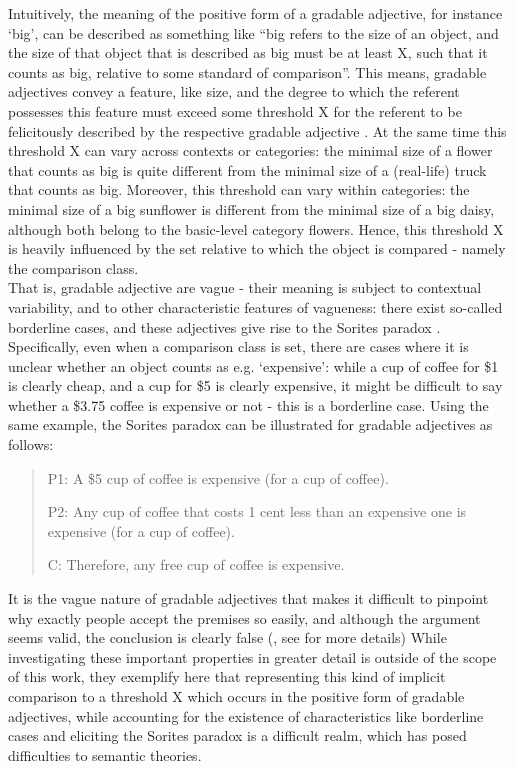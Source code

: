 Intuitively, the meaning of the positive form of a gradable adjective, for instance ‘big’, can be described as something like “big refers to the size of an object, and the size of that object that is described as big must be at least X, such that it counts as big, relative to some standard of comparison”. This means, gradable adjectives convey a feature, like size, and the degree to which the referent possesses this feature must exceed some threshold X for the referent to be felicitously described by the respective gradable adjective \parencite{Kennedy2007}. At the same time this threshold X can vary across contexts or categories: the minimal size of a flower that counts as big is quite different from the minimal size of a (real-life) truck that counts as big. Moreover, this threshold can vary within categories: the minimal size of a big sunflower is different from the minimal size of a big daisy, although both belong to the basic-level category flowers. Hence, this threshold X is heavily influenced by the set relative to which the object is compared - namely the comparison class. \\
That is, gradable adjective are vague - their meaning is subject to contextual variability, and to other characteristic features of vagueness: there exist so-called borderline cases, and these adjectives give rise to the Sorites paradox \parencite{Kennedy2007}. Specifically, even when a comparison class is set, there are cases where it is unclear whether an object counts as e.g. ‘expensive’: while a cup of coffee for \$1 is clearly cheap, and a cup for \$5 is clearly expensive, it might be difficult to say whether a  \$3.75 coffee is expensive or not - this is a borderline case. Using the same example, the Sorites paradox can be illustrated for gradable adjectives as follows: 
\begin{quotation}
P1: A \$5 cup of coffee is expensive (for a cup of coffee). 

P2: Any cup of coffee that costs 1 cent less than an expensive one is expensive (for a cup of coffee). 

C: Therefore, any free cup of coffee is expensive. 
\end{quotation}

It is the vague nature of gradable adjectives that makes it difficult to pinpoint why exactly people accept the premises so easily, and although the argument seems valid, the conclusion is clearly false (\textcite{Kennedy2007}, see for more details)
While investigating these important properties in greater detail is outside of the scope of this work, they exemplify here that representing this kind of implicit comparison to a threshold X which occurs in the positive form of gradable adjectives, while accounting for the existence of characteristics like borderline cases and eliciting the Sorites paradox is a difficult realm, which has posed difficulties to semantic theories. 

